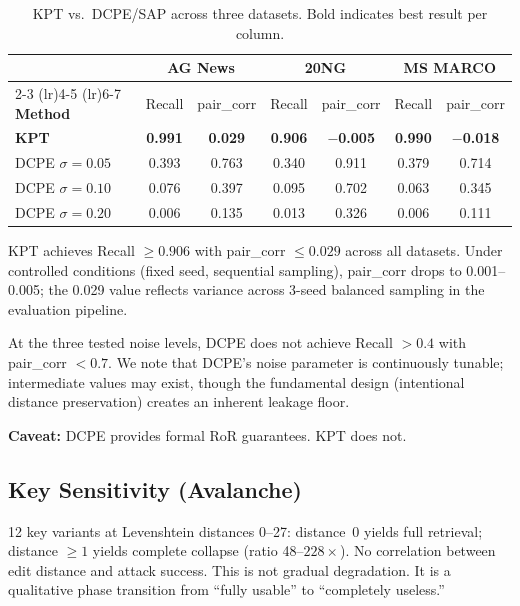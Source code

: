 \documentclass{article}
\begin{document}
\begin{table}[htbp]
\centering
\caption{KPT vs.\ DCPE/SAP across three datasets. Bold indicates best result per column.}
\label{tab:dcpe}
\begin{tabular}{@{}l*{2}{c}*{2}{c}*{2}{c}@{}}
\toprule
 & \multicolumn{2}{c}{\textbf{AG News}} & \multicolumn{2}{c}{\textbf{20NG}} & \multicolumn{2}{c}{\textbf{MS MARCO}} \\
\cmidrule(lr){2-3} \cmidrule(lr){4-5} \cmidrule(lr){6-7}
\textbf{Method} & Recall & pair\_corr & Recall & pair\_corr & Recall & pair\_corr \\
\midrule
\textbf{KPT} & \textbf{0.991} & \textbf{0.029} & \textbf{0.906} & \textbf{$-$0.005} & \textbf{0.990} & \textbf{$-$0.018} \\
DCPE $\sigma{=}0.05$ & 0.393 & 0.763 & 0.340 & 0.911 & 0.379 & 0.714 \\
DCPE $\sigma{=}0.10$ & 0.076 & 0.397 & 0.095 & 0.702 & 0.063 & 0.345 \\
DCPE $\sigma{=}0.20$ & 0.006 & 0.135 & 0.013 & 0.326 & 0.006 & 0.111 \\
\bottomrule
\end{tabular}
\end{table}

KPT achieves Recall $\geq 0.906$ with pair\_corr $\leq 0.029$ across all datasets.
Under controlled conditions (fixed seed, sequential sampling), pair\_corr drops to 0.001--0.005;
the 0.029 value reflects variance across 3-seed balanced sampling in the evaluation pipeline.

At the three tested noise levels, DCPE does not achieve Recall $> 0.4$ with pair\_corr $< 0.7$.
We note that DCPE's noise parameter is continuously tunable; intermediate values may exist, though the fundamental design (intentional distance preservation) creates an inherent leakage floor.

\textbf{Caveat:} DCPE provides formal RoR guarantees. KPT does not.

\subsection{Key Sensitivity (Avalanche)}

12 key variants at Levenshtein distances 0--27: distance~0 yields full retrieval; distance $\geq 1$ yields complete collapse (ratio 48--$228\times$).
No correlation between edit distance and attack success.
This is not gradual degradation.
It is a qualitative phase transition from ``fully usable'' to ``completely useless.''
\end{document}
